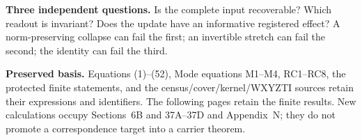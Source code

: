 \medskip
\noindent\textbf{Three independent questions.} Is the complete input recoverable? Which readout is invariant? Does the update have an informative registered effect? A norm-preserving collapse can fail the first; an invertible stretch can fail the second; the identity can fail the third.

\medskip
\noindent\textbf{Preserved basis.} Equations (1)--(52), Mode equations M1--M4, RC1--RC8, the protected finite statements, and the census/cover/kernel/WXYZTI sources retain their expressions and identifiers. The following pages retain the finite results. New calculations occupy Sections~6B and 37A--37D and Appendix~N; they do not promote a correspondence target into a carrier theorem.
